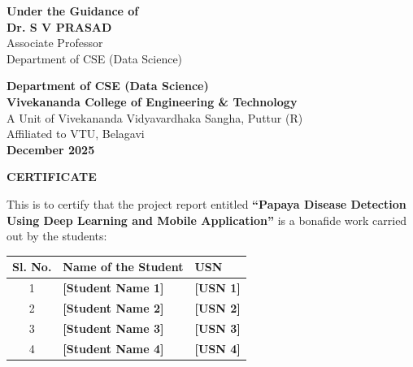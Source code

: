 \documentclass[12pt,a4paper]{report}
\begin{document}
\begin{titlepage}
\begin{center}
{\normalsize\bfseries Under the Guidance of}\\[5pt]
{\normalsize\bfseries Dr. S V PRASAD}\\
{\normalsize Associate Professor}\\
{\normalsize Department of CSE (Data Science)}\\[20pt]

\begin{figure}[h!]
\centering
\end{figure}

{\normalsize\bfseries Department of CSE (Data Science)}\\[3pt]
{\normalsize\bfseries Vivekananda College of Engineering \& Technology}\\[2pt]
{\small A Unit of Vivekananda Vidyavardhaka Sangha, Puttur (R)}\\[2pt]
{\small Affiliated to VTU, Belagavi}\\[5pt]
{\normalsize\bfseries December 2025}

\end{center}
\end{titlepage}

\setcounter{page}{1}

\newpage
\thispagestyle{plain}
\begin{center}
{\Large\bfseries CERTIFICATE}
\end{center}
\vspace{0.5cm}

This is to certify that the project report entitled \textbf{``Papaya Disease Detection Using Deep Learning and Mobile Application''} is a bonafide work carried out by the students:

\vspace{0.5cm}
\begin{center}
\begin{tabular}{|c|l|l|}
\hline
\textbf{Sl. No.} & \textbf{Name of the Student} & \textbf{USN} \\
\hline
1 & \textbf{[Student Name 1]} & \textbf{[USN 1]} \\
\hline
2 & \textbf{[Student Name 2]} & \textbf{[USN 2]} \\
\hline
3 & \textbf{[Student Name 3]} & \textbf{[USN 3]} \\
\hline
4 & \textbf{[Student Name 4]} & \textbf{[USN 4]} \\
\hline
\end{tabular}
\end{center}
\vspace{0.5cm}
\end{document}
